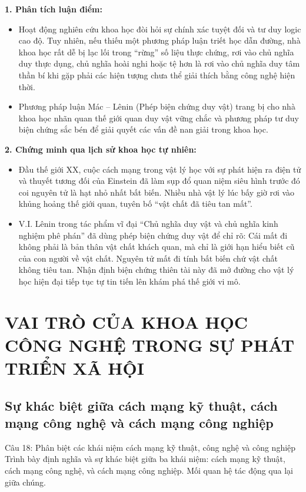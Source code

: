 \documentclass[12pt,a4paper]{article}
\begin{document}
{\noindent
\textbf{1. Phân tích luận điểm:}
\begin{itemize}
    \item Hoạt động nghiên cứu khoa học đòi hỏi sự chính xác tuyệt đối và tư duy logic cao độ. Tuy nhiên, nếu thiếu một phương pháp luận triết học dẫn đường, nhà khoa học rất dễ bị lạc lối trong ``rừng'' số liệu thực chứng, rơi vào chủ nghĩa duy thực dụng, chủ nghĩa hoài nghi hoặc tệ hơn là rơi vào chủ nghĩa duy tâm thần bí khi gặp phải các hiện tượng chưa thể giải thích bằng công nghệ hiện thời.
    \item Phương pháp luận Mác -- Lênin (Phép biện chứng duy vật) trang bị cho nhà khoa học nhãn quan thế giới quan duy vật vững chắc và phương pháp tư duy biện chứng sắc bén để giải quyết các vấn đề nan giải trong khoa học.
\end{itemize}

\noindent
\textbf{2. Chứng minh qua lịch sử khoa học tự nhiên:}
\begin{itemize}
    \item Đầu thế giới XX, cuộc cách mạng trong vật lý học với sự phát hiện ra điện tử và thuyết tương đối của Einstein đã làm sụp đổ quan niệm siêu hình trước đó coi nguyên tử là hạt nhỏ nhất bất biến. Nhiều nhà vật lý lúc bấy giờ rơi vào khủng hoảng thế giới quan, tuyên bố ``vật chất đã tiêu tan mất''.
    \item V.I. Lênin trong tác phẩm vĩ đại ``Chủ nghĩa duy vật và chủ nghĩa kinh nghiệm phê phán'' đã dùng phép biện chứng duy vật để chỉ rõ: Cái mất đi không phải là bản thân vật chất khách quan, mà chỉ là giới hạn hiểu biết cũ của con người về vật chất. Nguyên tử mất đi tính bất biến chứ vật chất không tiêu tan. Nhận định biện chứng thiên tài này đã mở đường cho vật lý học hiện đại tiếp tục tự tin tiến lên khám phá thế giới vi mô.
\end{itemize}

\newpage
\section{VAI TRÒ CỦA KHOA HỌC CÔNG NGHỆ TRONG SỰ PHÁT TRIỂN XÃ HỘI}

\subsection{Sự khác biệt giữa cách mạng kỹ thuật, cách mạng công nghệ và cách mạng công nghiệp}

\begin{questionbox}{Câu 18: Phân biệt các khái niệm cách mạng kỹ thuật, công nghệ và công nghiệp}
Trình bày định nghĩa và sự khác biệt giữa ba khái niệm: cách mạng kỹ thuật, cách mạng công nghệ, và cách mạng công nghiệp. Mối quan hệ tác động qua lại giữa chúng.
\end{questionbox}

}
\end{document}
